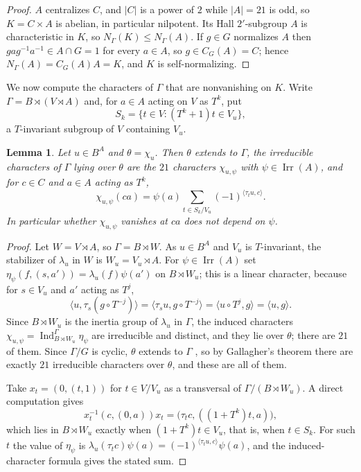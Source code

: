 \documentclass[11pt]{article}
\newtheorem{lemma}[theorem]{Lemma}
\theoremstyle{definition}
\theoremstyle{remark}
\newcommand{\Irr}{\operatorname{Irr}}
\newcommand{\Ind}{\operatorname{Ind}}
\begin{document}
\begin{proof}
$A$ centralizes $C$, and $|C|$ is a power of $2$ while $|A|=21$ is odd,
so $K=C\times A$ is abelian, in particular nilpotent.  Its Hall
$2'$-subgroup $A$ is characteristic in $K$, so
$N_\Gamma(K)\le N_\Gamma(A)$.  If $g\in G$ normalizes $A$ then
$gag^{-1}a^{-1}\in A\cap G=1$ for every $a\in A$, so $g\in C_G(A)=C$;
hence $N_\Gamma(A)=C_G(A)A=K$, and $K$ is self-normalizing.
\end{proof}

We now compute the characters of $\Gamma$ that are nonvanishing on $K$.
Write $\Gamma=B\rtimes(V\rtimes A)$ and, for $a\in A$ acting on $V$ as
$T^k$, put
\[
 S_k=\{t\in V:(T^k+1)t\in V_u\},
\]
a $T$-invariant subgroup of $V$ containing $V_u$.

\begin{lemma}\label{lem:gamma-values}
Let $u\in B^A$ and $\theta=\chi_u$.  Then $\theta$ extends to $\Gamma$,
the irreducible characters of $\Gamma$ lying over $\theta$ are the $21$
characters $\chi_{u,\psi}$ with $\psi\in\Irr(A)$, and for $c\in C$ and
$a\in A$ acting as $T^k$,
\[
 \chi_{u,\psi}(ca)=\psi(a)\sum_{t\in S_k/V_u}(-1)^{\langle\tau_tu,c\rangle}.
\]
In particular whether $\chi_{u,\psi}$ vanishes at $ca$ does not depend on
$\psi$.
\end{lemma}

\begin{proof}
Let $W=V\rtimes A$, so $\Gamma=B\rtimes W$.  As $u\in B^A$ and $V_u$ is
$T$-invariant, the stabilizer of $\lambda_u$ in $W$ is
$W_u=V_u\rtimes A$.  For $\psi\in\Irr(A)$ set
$\eta_\psi(f,(s,a'))=\lambda_u(f)\psi(a')$ on $B\rtimes W_u$; this is a
linear character, because for $s\in V_u$ and $a'$ acting as $T^j$,
\[
 \langle u,\tau_s(g\circ T^{-j})\rangle
 =\langle\tau_su,g\circ T^{-j}\rangle
 =\langle u\circ T^{j},g\rangle=\langle u,g\rangle .
\]
Since $B\rtimes W_u$ is the inertia group of $\lambda_u$ in $\Gamma$,
the induced characters $\chi_{u,\psi}=\Ind_{B\rtimes W_u}^\Gamma\eta_\psi$
are irreducible and distinct, and they lie over $\theta$; there are
$21$ of them.  Since $\Gamma/G$ is cyclic, $\theta$ extends to
$\Gamma$ \cite[Corollary 11.22]{isaacs-book}, so by Gallagher's
theorem \cite[Corollary 6.17]{isaacs-book} there are exactly $21$
irreducible characters over $\theta$, and these are all of them.

Take $x_t=(0,(t,1))$ for $t\in V/V_u$ as a transversal of
$\Gamma/(B\rtimes W_u)$.  A direct computation gives
\[
 x_t^{-1}(c,(0,a))x_t=\bigl(\tau_tc,((1+T^k)t,a)\bigr),
\]
which lies in $B\rtimes W_u$ exactly when $(1+T^k)t\in V_u$, that is,
when $t\in S_k$.  For such $t$ the value of $\eta_\psi$ is
$\lambda_u(\tau_tc)\psi(a)=(-1)^{\langle\tau_tu,c\rangle}\psi(a)$, and
the induced-character formula gives the stated sum.
\end{proof}
\end{document}

